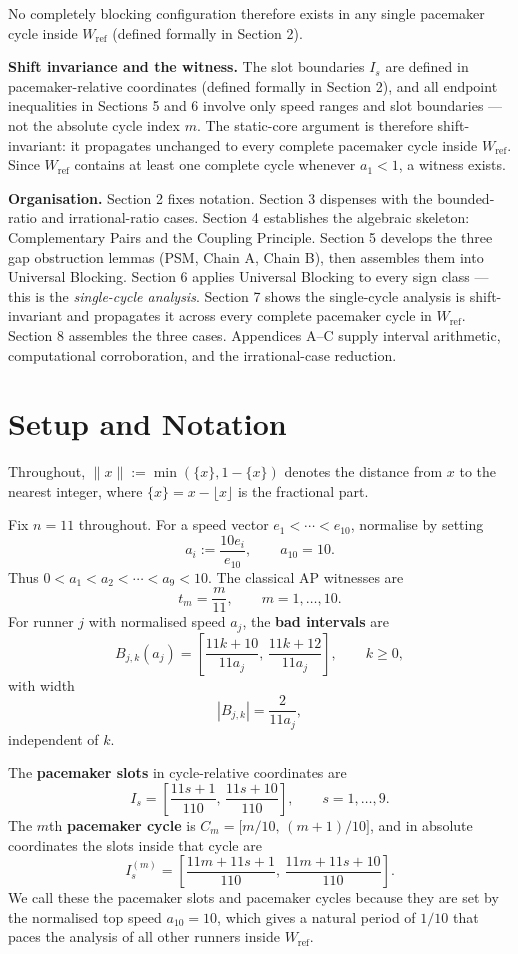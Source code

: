 \documentclass[12pt]{article}
\begin{document}
No completely blocking configuration therefore exists in any single pacemaker cycle
inside $W_{\mathrm{ref}}$ (defined formally in Section 2).

\textbf{Shift invariance and the witness.}
The slot boundaries $I_s$ are defined in pacemaker-relative coordinates (defined formally
in Section 2), and all endpoint inequalities in Sections 5 and 6 involve only speed ranges
and slot boundaries --- not the absolute cycle index $m$. The static-core argument is
therefore shift-invariant: it propagates unchanged to every complete pacemaker cycle
inside $W_{\mathrm{ref}}$. Since $W_{\mathrm{ref}}$ contains at least one complete cycle
whenever $a_1<1$, a witness exists.

\textbf{Organisation.} Section 2 fixes notation. Section 3 dispenses with the bounded-ratio
and irrational-ratio cases. Section 4 establishes the algebraic skeleton: Complementary
Pairs and the Coupling Principle. Section 5 develops the three gap obstruction lemmas
(PSM, Chain A, Chain B), then assembles them into Universal Blocking. Section 6 applies
Universal Blocking to every sign class --- this is the \emph{single-cycle analysis}. Section 7
shows the single-cycle analysis is shift-invariant and propagates it across every complete
pacemaker cycle in $W_{\mathrm{ref}}$. Section 8 assembles the three cases. Appendices A--C
supply interval arithmetic, computational corroboration, and the irrational-case reduction.



\section{Setup and Notation}

Throughout, $\|x\| := \min(\{x\}, 1-\{x\})$ denotes the distance from $x$ to the nearest
integer, where $\{x\}=x-\lfloor x\rfloor$ is the fractional part.

Fix $n=11$ throughout. For a speed vector $e_1<\cdots<e_{10}$, normalise by setting
\[
a_i := \frac{10e_i}{e_{10}},\qquad a_{10}=10.
\]
Thus $0<a_1<a_2<\cdots<a_9<10$. The classical AP witnesses are
\[
t_m = \frac{m}{11},\qquad m=1,\ldots,10.
\]
For runner $j$ with normalised speed $a_j$, the \textbf{bad intervals} are
\[
B_{j,k}(a_j) = \left[\frac{11k+10}{11a_j},\,\frac{11k+12}{11a_j}\right],\qquad k\ge 0,
\]
with width
\[
|B_{j,k}| = \frac{2}{11a_j},
\]
independent of $k$.

The \textbf{pacemaker slots} in cycle-relative coordinates are
\[
I_s = \left[\frac{11s+1}{110},\,\frac{11s+10}{110}\right],\qquad s=1,\ldots,9.
\]
The $m$th \textbf{pacemaker cycle} is $C_m=\bigl[m/10,\,(m+1)/10\bigr]$, and in absolute
coordinates the slots inside that cycle are
\[
I_s^{(m)} = \left[\frac{11m+11s+1}{110},\,\frac{11m+11s+10}{110}\right].
\]
We call these the pacemaker slots and pacemaker cycles because they are set by the
normalised top speed $a_{10}=10$, which gives a natural period of $1/10$ that paces the
analysis of all other runners inside $W_{\mathrm{ref}}$.
\end{document}
